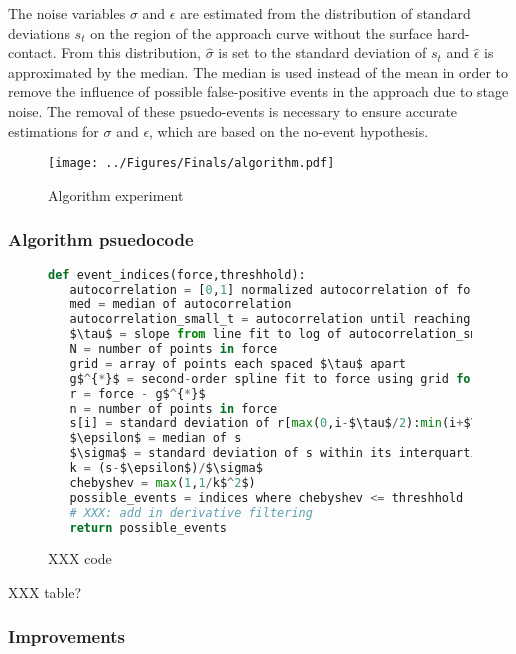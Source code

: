 \documentclass[%
  aip,12pt,tightenlines,
  amsthm,
 amsmath,amssymb
]{article}
\newcommand{\fLabel}[1]{\label{figure:#1}}
\newcommand{\pEndF}[0]{ \\ }
\newcommand{\pStartF}[0]{ }
\newcommand{\name}[0]{Feather}
\newcommand{\figwidth}[0]{\linewidth}
\begin{document}
The noise variables $\sigma$ and $\epsilon$ are estimated from the distribution of standard deviations $s_t$ on the region of the approach curve without the surface hard-contact. From this distribution, $\hat{\sigma}$ is set to the standard deviation of $s_t$ and $\hat{\epsilon}$ is approximated by the median. The median is used instead of the mean in order to remove the influence of possible false-positive events in the approach due to stage noise. The removal of these psuedo-events is necessary to ensure accurate estimations for $\sigma$ and $\epsilon$, which are based on the no-event hypothesis.


\begin{figure}
\centering
\texttt{[image: ../Figures/Finals/algorithm.pdf]}%
\caption[\name{} algorithmic pipeline]{\noindent\fLabel{FeatherExample}\pStartF Algorithm experiment \pEndF }
\end{figure}


\subsubsection{Algorithm psuedocode}

\begin{figure}
  \begin{lstlisting}[language=Python]
def event_indices(force,threshhold):
   autocorrelation = [0,1] normalized autocorrelation of force
   med = median of autocorrelation
   autocorrelation_small_t = autocorrelation until reaching med
   $\tau$ = slope from line fit to log of autocorrelation_small_t
   N = number of points in force
   grid = array of points each spaced $\tau$ apart
   g$^{*}$ = second-order spline fit to force using grid for knots
   r = force - g$^{*}$
   n = number of points in force
   s[i] = standard deviation of r[max(0,i-$\tau$/2):min(i+$\tau$/2,n)]
   $\epsilon$ = median of s
   $\sigma$ = standard deviation of s within its interquartile region
   k = (s-$\epsilon$)/$\sigma$
   chebyshev = max(1,1/k$^2$)
   possible_events = indices where chebyshev <= threshhold
   # XXX: add in derivative filtering
   return possible_events
\end{lstlisting}
\caption[\name{} psuedocode]{\noindent\fLabel{Code}\pStartF XXX code  \pEndF }
\end{figure}


XXX table?

\subsubsection{Improvements}
\end{document}
